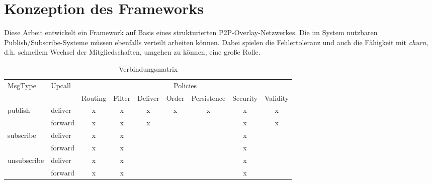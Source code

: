 \chapter{Konzeption des Frameworks}
\label{chap:konzeption_pubsub}
Diese Arbeit entwickelt ein Framework auf Basis eines strukturierten P2P-Overlay-Netzwerkes. Die im System nutzbaren Publish/Subscribe-Systeme müssen ebenfalls verteilt arbeiten können. Dabei spielen die Fehlertoleranz und auch die Fähigkeit mit \emph{churn}, d.h. schnellem Wechsel der Mitgliedschaften, umgehen zu können, eine große Rolle.

\begin{table}[!h]
\caption{Verbindungsmatrix}
\label{tab:konzeption_pubsub:verbindungsmatrix}
\centering
\begin{tabular}{llccccccc}
\toprule
MsgType & Upcall	& \multicolumn{7}{c}{Policies} \\
\cmidrule{3-9}
				&		& Routing & Filter & Deliver & Order & Persistence & Security & Validity \\
\midrule
publish	    & deliver & x & x & x & x & x & x & x \\
\cmidrule{2-9}
					  & forward & x & x & x &   &   & x & x \\
\midrule
subscribe	  & deliver & x & x &   &   &   & x & \\
\cmidrule{2-9}
			      & forward & x & x &   &   &   & x & \\
\midrule
unsubscribe & deliver & x & x &   &   &   & x & \\
\cmidrule{2-9}
			      & forward & x & x &   &   &   & x & \\
\bottomrule
\end{tabular}
\end{table}





\cite{BeFiMu2006PubSubQoS}


\cite{KostasKatrinis2005}
